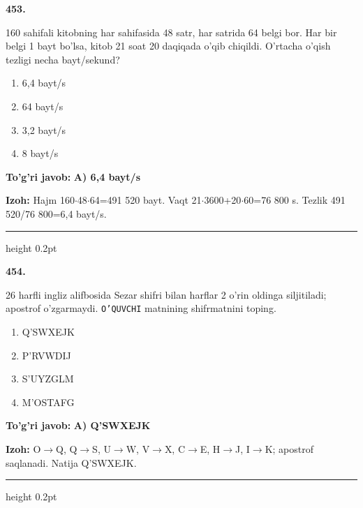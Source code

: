 \documentclass[10pt,a4paper,oneside]{article}
\begin{document}
\noindent\textbf{\color{ink}453.}
\par
160 sahifali kitobning har sahifasida 48 satr, har satrida 64 belgi bor. Har bir belgi 1 bayt bo'lsa, kitob 21 soat 20 daqiqada o'qib chiqildi. O'rtacha o'qish tezligi necha bayt/sekund?
\begin{enumerate}[label=\Alph*),leftmargin=9mm]
\item 6,4 bayt/s
\item 64 bayt/s
\item 3,2 bayt/s
\item 8 bayt/s
\end{enumerate}
\begin{tcolorbox}[enhanced,breakable,colback=teal!4,colframe=teal!50!black,boxrule=0.5pt,arc=1.1mm,left=3mm,right=3mm,top=1.7mm,bottom=1.7mm,before skip=2mm,after skip=2mm]
\textbf{\color{teal}To'g'ri javob:} \textbf{A) 6,4 bayt/s}
\par\smallskip
\textbf{Izoh:} Hajm 160\ensuremath{\cdot}48\ensuremath{\cdot}64=491 520 bayt. Vaqt 21\ensuremath{\cdot}3600+20\ensuremath{\cdot}60=76 800 s. Tezlik 491 520/76 800=6,4 bayt/s.
\end{tcolorbox}
\vspace{2mm}\hrule height 0.2pt \vspace{3mm}

\noindent\textbf{\color{ink}454.}
\par
26 harfli ingliz alifbosida Sezar shifri bilan harflar 2 o'rin oldinga siljitiladi; apostrof o'zgarmaydi. \texttt{O'QUVCHI} matnining shifrmatnini toping.
\begin{enumerate}[label=\Alph*),leftmargin=9mm]
\item Q'SWXEJK
\item P'RVWDIJ
\item S'UYZGLM
\item M'OSTAFG
\end{enumerate}
\begin{tcolorbox}[enhanced,breakable,colback=teal!4,colframe=teal!50!black,boxrule=0.5pt,arc=1.1mm,left=3mm,right=3mm,top=1.7mm,bottom=1.7mm,before skip=2mm,after skip=2mm]
\textbf{\color{teal}To'g'ri javob:} \textbf{A) Q'SWXEJK}
\par\smallskip
\textbf{Izoh:} O\ensuremath{\to}Q, Q\ensuremath{\to}S, U\ensuremath{\to}W, V\ensuremath{\to}X, C\ensuremath{\to}E, H\ensuremath{\to}J, I\ensuremath{\to}K; apostrof saqlanadi. Natija Q'SWXEJK.
\end{tcolorbox}
\vspace{2mm}\hrule height 0.2pt \vspace{3mm}
\end{document}
